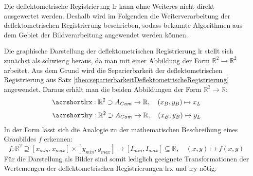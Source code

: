 Die deflektometrische Registrierung \acrshort{lr} kann ohne Weiteres nicht direkt ausgewertet werden.
Deshalb wird im Folgenden die Weiterverarbeitung der deflektometrischen Registrierung beschrieben, sodass bekannte Algorithmen aus dem Gebiet der Bildverarbeitung angewendet werden können.

\p
Die graphische Darstellung der deflektometrischen Registrierung \acrshort{lr} stellt sich zunächst als schwierig heraus, da man mit einer Abbildung der Form $\mathbb{R}^2 \rightarrow \mathbb{R}^2$ arbeitet.
Aus dem Grund wird die Separierbarkeit der deflektometrischen Registrierung aus Satz \ref{theo:separierbarkeitDeflektometrischeRegistrierung} angewendet.
Daraus erhält man die beiden Abbildungen der Form $\mathbb{R}^2 \rightarrow \mathbb{R}$:
%
\begin{equation*}
	\acrshortmath{lrx} : \mathbb{R}^{2} \supset A_{Cam} \rightarrow \mathbb{R} ,\quad (x_{B}, y_{B}) \mapsto x_{L}
\end{equation*}
%
\begin{equation*}
	\acrshortmath{lry} : \mathbb{R}^{2} \supset A_{Cam} \rightarrow \mathbb{R} ,\quad (x_{B}, y_{B}) \mapsto y_{L}
\end{equation*}
%
In der Form lässt sich die Analogie zu der mathematischen Beschreibung eines Graubildes $f$ erkennen:
%
\begin{equation*}
	f : \mathbb{R}^{2} \supseteq [x_{min},x_{max}] \times [y_{min},y_{max}] \rightarrow [I_{min},I_{max}] \subseteq \mathbb{R} ,\quad (x,y) \mapsto f(x,y)
\end{equation*}
%
Für die Darstellung als Bilder sind somit lediglich geeignete Transformationen der Wertemengen der deflektometrischen Registrierungen \acrshort{lrx} und \acrshort{lry} nötig.
%
